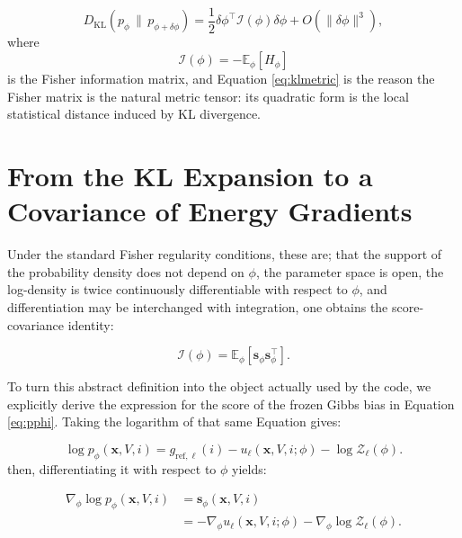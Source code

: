 \begin{equation}
    D_{\mathrm{KL}}
    \left(
        p_\phi
        \,\|\, 
        p_{\phi + \delta \phi}
    \right)
    =
    \frac{1}{2}
    \delta \phi^\top
    \mathcal{I}(\phi)
    \delta \phi
    +
    O(\|\delta \phi\|^3),
    \label{eq:klmetric}
\end{equation}
%
where
%
\begin{equation}
    \mathcal{I}(\phi)
    =
    -
    \mathbb{E}_\phi[H_\phi]
    \label{eq:fimhessian}
\end{equation}
%
is the Fisher information matrix, and Equation \eqref{eq:klmetric} is the reason the Fisher matrix is the natural metric tensor: its quadratic form is the local statistical distance induced by KL divergence.

\section{From the KL Expansion to a Covariance of Energy Gradients}

Under the standard Fisher regularity conditions, these are; that the support of the probability density does not depend on $\phi$, the parameter space is open, the log-density is twice continuously differentiable with respect to $\phi$, and differentiation may be interchanged with integration, one obtains the score-covariance identity:

\begin{equation}
    \mathcal{I}(\phi)
    =
    \mathbb{E}_\phi
    \left[
        \mathbf{s}_\phi
        \mathbf{s}_\phi^\top
    \right].
    \label{eq:fimscore}
\end{equation}

To turn this abstract definition into the object actually used by the code, we explicitly derive the expression for the score of the frozen Gibbs bias in Equation \eqref{eq:pphi}. Taking the logarithm of that same Equation gives:

\begin{equation}
    \log p_\phi(\mathbf{x}, V, i)
    =
    g_{\mathrm{ref},\ell}(i)
    -
    u_\ell(\mathbf{x}, V, i; \phi)
    -
    \log \mathcal{Z}_\ell(\phi).
    \label{eq:logpphi}
\end{equation}
%
then, differentiating it with respect to $\phi$ yields:

\begin{align}
    \nabla_{\phi}\log p_\phi(\mathbf{x}, V, i)
    &=
    \mathbf{s}_\phi(\mathbf{x}, V, i)
    \nonumber\\
    &=
    -
    \nabla_\phi u_\ell(\mathbf{x}, V, i; \phi)
    -
    \nabla_\phi \log \mathcal{Z}_\ell(\phi).
    \label{eq:score1}
\end{align}

